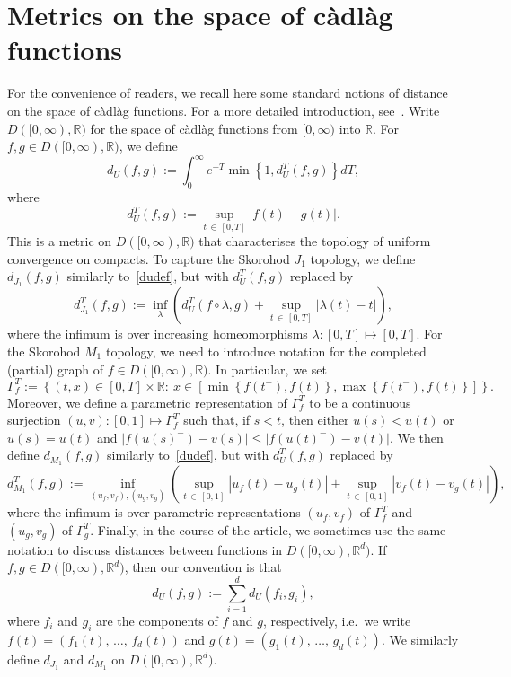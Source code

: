 \documentclass[AHL,Unicode,longabstracts,published]{cedram}
\newcommand{\R}{\mathbb R}
\newcommand{\cadlag}{càdlàg }
\begin{document}
\appendix

\section{Metrics on the space of \cadlag functions}\label{metricapp}

For the convenience of readers, we recall here some standard notions of distance on the space of \cadlag functions. For a more detailed introduction, see~\cite[Chapters~3 and 12]{Whitt}. Write $D([0,\infty),\R)$ for the space of \cadlag functions from $[0,\infty)$ into $\R$. For $f,g\in D([0,\infty),\R)$, we define
\begin{equation}\label{dudef}
d_U(f,g):=\int_{0}^\infty e^{-T} \min\left\{1, d^T_U(f,g)\right\}dT,
\end{equation}
where
\[
d^T_U(f,g):=\sup_{t\,\in\,[0,T]}\left|f(t)-g(t)\right|.
\]
This is a metric on $D([0,\infty),\R)$ that characterises the topology of uniform convergence on compacts. To capture the Skorohod $J_1$ topology, we define $d_{J_1}(f,g)$ similarly to~\eqref{dudef}, but with $d^T_U(f,g)$ replaced by
\[
d^T_{J_1}(f,g):=\inf_{\lambda}\left(d^T_U(f\circ\lambda,g)+\sup_{t\,\in\,[0,T]}\left|\lambda(t)-t\right|\right),
\]
where the infimum is over increasing homeomorphisms $\lambda:[0,T]\mapsto[0,T]$. For the Skorohod $M_1$ topology, we need to introduce notation for the completed (partial) graph of $f\in D([0,\infty),\R)$. In particular, we set
\[
\Gamma^T_f:=\left\{(t,x)\in[0,T]\times \R:\:x\in\left[\min\left\{f(t^-),f(t)\right\},\max\left\{f(t^-),f(t)\right\}\right]\right\}.
\]
Moreover, we define a parametric representation of $\Gamma^T_f$ to be a continuous surjection $(u,v):[0,1]\mapsto \Gamma^T_f$ such that, if $s<t$, then either $u(s)<u(t)$ or $u(s)=u(t)$ and $|f(u(s)^-)-v(s)|\leq |f(u(t)^-)-v(t)|$. We then define $d_{M_1}(f,g)$ similarly to~\eqref{dudef}, but with $d^T_U(f,g)$ replaced by
\[
d^T_{M_1}(f,g):=\inf_{(u_f,v_f),(u_g,v_g)}\left(\sup_{t\,\in\,[0,1]}\left|u_f(t)-u_g(t)\right|+\sup_{t\,\in\,[0,1]}\left|v_f(t)-v_g(t)\right|\right),
\]
where the infimum is over parametric representations $(u_f,v_f)$ of $\Gamma^T_f$ and $(u_g,v_g)$ of $\Gamma^T_g$. Finally, in the course of the article, we sometimes use the same notation to discuss distances between functions in $D([0,\infty),\R^d)$. If $f,g\in D([0,\infty),\R^d)$, then our convention is that
\[
d_{U}(f,g):=\sum_{i=1}^dd_{U}(f_i,g_i),
\]
where $f_i$ and $g_i$ are the components of $f$ and $g$, respectively, i.e.\ we write $f(t)=(f_1(t),\,\dots,\,f_d(t))$ and $g(t)=(g_1(t),\,\dots,\,g_d(t))$. We similarly define $d_{J_1}$ and $d_{M_1}$ on $D([0,\infty),\R^d)$.
\end{document}
